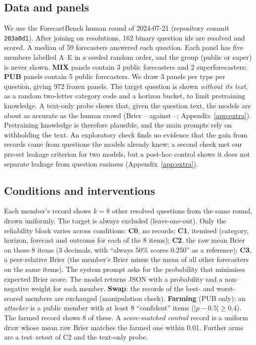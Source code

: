 \documentclass[11pt,letterpaper]{article}
\begin{document}
\subsection{Data and panels}
We use the ForecastBench human round of 2024-07-21 (repository commit \texttt{203a0d1}). After joining on resolutions,
162 binary question ids are resolved and scored. A median of 59 forecasters answered each question. Each panel has five
members labelled A--E in a seeded random order, and the group (public or super) is never shown. \textbf{MIX} panels
contain 3 public forecasters and 2 superforecasters; \textbf{PUB} panels contain 5 public forecasters. We draw 3 panels
per type per question, giving 972 frozen panels. The target question is shown \emph{without its text}, as a random
two-letter category code and a horizon bucket, to limit pretraining knowledge. A text-only probe shows that,
given the question text, the models are about as accurate as the human crowd (Brier \probeSonnet--\probeHaiku{} against
\probeCrowdLo--\probeCrowdHi; Appendix~\ref{app:extra}). Pretraining knowledge is therefore plausible, and the main
prompts rely on withholding the text. An exploratory check finds no evidence that the gain from records came from questions the
models already knew; a second check met our pre-set leakage criterion for two models, but a post-hoc control shows it
does not separate leakage from question easiness (Appendix~\ref{app:extra}).

\subsection{Conditions and interventions}
Each member's record shows $k=8$ other resolved questions from the same round, drawn uniformly. The target is always
excluded (leave-one-out). Only the reliability block varies across conditions:
\textbf{C0}, no records;
\textbf{C1}, itemised (category, horizon, forecast and outcome for each of the 8 items);
\textbf{C2}, the raw mean Brier on those 8 items (3 decimals, with ``always 50\% scores 0.250'' as a reference);
\textbf{C3}, a peer-relative Brier (the member's Brier minus the mean of all other forecasters on the same items).
The system prompt asks for the probability that minimises expected Brier score. The model returns JSON with a
probability and a non-negative weight for each member.
\textbf{Swap}: the records of the best- and worst-scored members are exchanged (manipulation check).
\textbf{Farming} (PUB only): an \emph{attacker} is a public member with at least 8 ``confident'' items
($|p-0.5|\ge 0.4$). The farmed record shows 8 of these. A \emph{score-matched control} record is a uniform draw whose
mean raw Brier matches the farmed one within 0.01. Further arms are a test--retest of C2 and the text-only probe.
\end{document}
